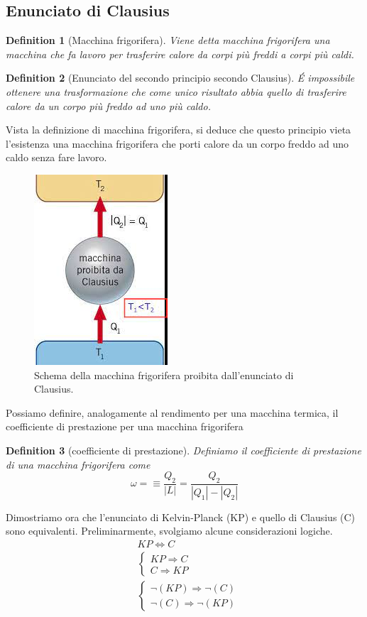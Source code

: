 \documentclass[10pt,a4paper]{article}
\newtheorem{definition}{Definition}
\begin{document}
\subsection{Enunciato di Clausius}
\begin{definition}[Macchina frigorifera]
	Viene detta macchina frigorifera una macchina che fa lavoro per trasferire calore da corpi più freddi a corpi più caldi. 
\end{definition}
\begin{definition}[Enunciato del secondo principio secondo Clausius]
	\'{E} impossibile ottenere una trasformazione che come unico risultato abbia quello di trasferire calore da un corpo più freddo ad uno più caldo. 
\end{definition}
Vista la definizione di macchina frigorifera, si deduce che questo principio vieta l'esistenza una macchina frigorifera che porti calore da un corpo freddo ad uno caldo senza fare lavoro. 
\begin{figure}[h!]
	\centering
	\includegraphics[width=0.35\linewidth]{../images/clausius}
	\caption{Schema della macchina frigorifera proibita dall'enunciato di Clausius.}
	\label{fig:clausius}
\end{figure}
\FloatBarrier
Possiamo definire, analogamente al rendimento per una macchina termica, il coefficiente di prestazione per una macchina frigorifera
\begin{definition}[coefficiente di prestazione]
	Definiamo il coefficiente di prestazione di una macchina frigorifera come \[\omega =\equiv \frac{Q_2}{|L|} = \frac{Q_2}{|Q_1|-|Q_2|}\]
\end{definition}
Dimostriamo ora che l'enunciato di Kelvin-Planck (KP) e quello di Clausius (C) sono equivalenti. Preliminarmente, svolgiamo alcune considerazioni logiche.
\begin{align*}
	&KP \Leftrightarrow C\\
	&\begin{cases}
		KP \Rightarrow C\\
		C \Rightarrow KP
	\end{cases}\\
	&\begin{cases}
		\neg(KP)\Rightarrow \neg(C)\\
		\neg(C)\Rightarrow \neg(KP)
	\end{cases}
\end{align*}
\end{document}
